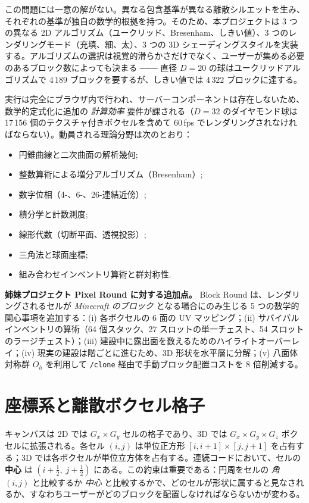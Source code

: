 \documentclass[12pt,a4paper]{scrartcl}
\newcommand{\acc}[1]{\textcolor{accent}{\textbf{#1}}}
\newcommand{\cmd}[1]{\textcolor{earth}{\texttt{\small #1}}}
\begin{document}
この問題には一意の解がない。異なる包含基準が異なる離散シルエットを生み、それぞれの基準が独自の数学的根拠を持つ。そのため、本プロジェクトは 3 つの異なる 2D アルゴリズム（ユークリッド、Bresenham、しきい値）、3 つのレンダリングモード（充填、細、太）、3 つの 3D シェーディングスタイルを実装する。アルゴリズムの選択は視覚的滑らかさだけでなく、ユーザーが集める必要のあるブロック数によっても決まる ─── 直径 $D=20$ の球はユークリッドアルゴリズムで $4\,189$ ブロックを要するが、しきい値では $4\,322$ ブロックに達する。

実行は完全にブラウザ内で行われ、サーバーコンポーネントは存在しないため、数学的定式化に追加の \emph{計算効率} 要件が課される（$D=32$ のダイヤモンド球は 17\,156 個のテクスチャ付きボクセルを含めて 60\,fps でレンダリングされなければならない）。動員される理論分野は次のとおり：
\begin{itemize}[leftmargin=1.3em,itemsep=0.15em,topsep=0.3em]
  \item 円錐曲線と二次曲面の解析幾何;
  \item 整数算術による増分アルゴリズム（Bresenham）;
  \item 数字位相（4-、6-、26-連結近傍）;
  \item 積分学と計数測度;
  \item 線形代数（切断平面、透視投影）;
  \item 三角法と球面座標;
  \item 組み合わせインベントリ算術と群対称性.
\end{itemize}

\textbf{姉妹プロジェクト Pixel Round に対する追加点。} Block Round は、レンダリングされるセルが \emph{Minecraft のブロック} となる場合にのみ生じる 5 つの数学的関心事項を追加する：(i) 各ボクセルの 6 面の UV マッピング；(ii) サバイバルインベントリの算術（64 個スタック、27 スロットの単一チェスト、54 スロットのラージチェスト）；(iii) 建設中に露出面を数えるためのハイライトオーバーレイ；(iv) 現実の建設は階ごとに進むため、3D 形状を水平層に分解；(v) 八面体対称群 $O_h$ を利用して \cmd{/clone} 経由で手動ブロック配置コストを $8$ 倍削減する。

\section{座標系と離散ボクセル格子}

キャンバスは 2D では $G_x \times G_y$ セルの格子であり、3D では $G_x \times G_y \times G_z$ ボクセルに拡張される。各セル $(i,j)$ は単位正方形 $[i, i+1] \times [j, j+1]$ を占有する；3D では各ボクセルが単位立方体を占有する。連続コードにおいて、セルの \acc{中心} は $(i+\tfrac{1}{2},\; j+\tfrac{1}{2})$ にある。この約束は重要である：円周をセルの \emph{角} $(i,j)$ と比較するか \emph{中心} と比較するかで、どのセルが形状に属すると見なされるか、すなわちユーザーがどのブロックを配置しなければならないかが変わる。
\end{document}
